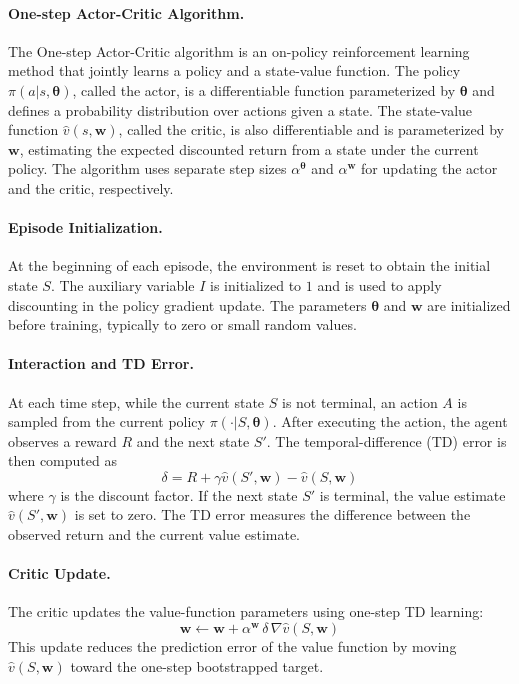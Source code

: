 \documentclass{article}
\begin{document}
\paragraph{One-step Actor-Critic Algorithm.}
The One-step Actor-Critic algorithm is an on-policy reinforcement learning method that jointly learns a policy and a state-value function. The policy $\pi(a | s, \bm{\theta})$, called the actor, is a differentiable function parameterized by $\bm{\theta}$ and defines a probability distribution over actions given a state. The state-value function $\hat v(s,\bm{w})$, called the critic, is also differentiable and is parameterized by $\bm{w}$, estimating the expected discounted return from a state under the current policy. The algorithm uses separate step sizes $\alpha^{\bm{\theta}}$ and $\alpha^{\bm{w}}$ for updating the actor and the critic, respectively.

\paragraph{Episode Initialization.}
At the beginning of each episode, the environment is reset to obtain the initial state $S$. The auxiliary variable $I$ is initialized to $1$ and is used to apply discounting in the policy gradient update. The parameters $\bm{\theta}$ and $\bm{w}$ are initialized before training, typically to zero or small random values.

\paragraph{Interaction and TD Error.}
At each time step, while the current state $S$ is not terminal, an action $A$ is sampled from the current policy $\pi(\cdot | S, \bm{\theta})$. After executing the action, the agent observes a reward $R$ and the next state $S'$. The temporal-difference (TD) error is then computed as
\[
\delta = R + \gamma \hat v(S', \bm{w}) - \hat v(S, \bm{w})
\]
where $\gamma$ is the discount factor. If the next state $S'$ is terminal, the value estimate $\hat v(S', \bm{w})$ is set to zero. The TD error measures the difference between the observed return and the current value estimate.

\paragraph{Critic Update.}
The critic updates the value-function parameters using one-step TD learning:
\[
\bm{w} \leftarrow \bm{w} + \alpha^{\bm{w}} \, \delta \, \nabla \hat v(S, \bm{w})
\]
This update reduces the prediction error of the value function by moving $\hat v(S,\bm{w})$ toward the one-step bootstrapped target.
\end{document}
